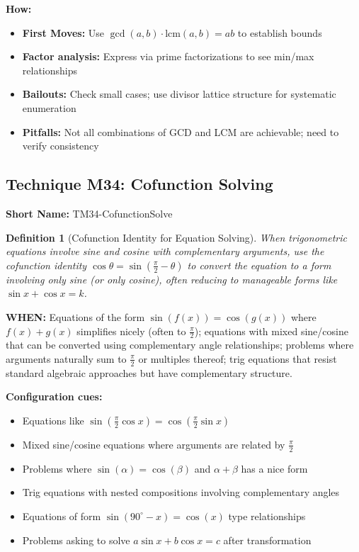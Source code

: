 \documentclass[12pt]{article}
\newtheorem{definition}{Definition}[section]
\begin{document}
\textbf{How:}
\begin{itemize}
    \item \textbf{First Moves:} Use $\gcd(a,b) \cdot \text{lcm}(a,b) = ab$ to establish bounds
    \item \textbf{Factor analysis:} Express via prime factorizations to see min/max relationships
    \item \textbf{Bailouts:} Check small cases; use divisor lattice structure for systematic enumeration
    \item \textbf{Pitfalls:} Not all combinations of GCD and LCM are achievable; need to verify consistency
\end{itemize}

\subsection{Technique M34: Cofunction Solving}
\textbf{Short Name:} TM34-CofunctionSolve

\begin{definition}[Cofunction Identity for Equation Solving]
When trigonometric equations involve sine and cosine with complementary arguments, use the cofunction identity $\cos\theta = \sin\left(\frac{\pi}{2} - \theta\right)$ to convert the equation to a form involving only sine (or only cosine), often reducing to manageable forms like $\sin x + \cos x = k$.
\end{definition}

\textbf{WHEN:} Equations of the form $\sin(f(x)) = \cos(g(x))$ where $f(x) + g(x)$ simplifies nicely (often to $\frac{\pi}{2}$); equations with mixed sine/cosine that can be converted using complementary angle relationships; problems where arguments naturally sum to $\frac{\pi}{2}$ or multiples thereof; trig equations that resist standard algebraic approaches but have complementary structure.

\textbf{Configuration cues:}
\begin{itemize}
    \item Equations like $\sin\left(\frac{\pi}{2}\cos x\right) = \cos\left(\frac{\pi}{2}\sin x\right)$
    \item Mixed sine/cosine equations where arguments are related by $\frac{\pi}{2}$
    \item Problems where $\sin(\alpha) = \cos(\beta)$ and $\alpha + \beta$ has a nice form
    \item Trig equations with nested compositions involving complementary angles
    \item Equations of form $\sin(90^\circ - x) = \cos(x)$ type relationships
    \item Problems asking to solve $a\sin x + b\cos x = c$ after transformation
\end{itemize}
\end{document}

